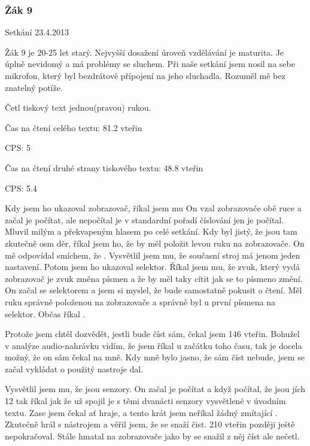 \subsubsection{Žák 9}
Setkání 23.4.2013

Žák 9 je 20-25 let starý.  Nejvyšší dosažení úroveň vzdělávání je maturita.  Je úplně nevidomý a má problémy se sluchem.  Při naše setkání jsem nosil na sebe mikrofon, který byl bezdrátově přípojení na jeho sluchadla.  Rozuměl mě bez znatelný potíže.

Četl tiskový text jednou(pravou) rukou.

Čas na čtení celého textu: 81.2 vteřin

CPS: 5

Čas na čtení druhé strany tiskového textu: 48.8 vteřin

CPS: 5.4

Kdy jsem ho ukazoval zobrazovač, říkal jsem mu  On vzal zobrazovače obě ruce a začal je počítat, ale nepočítal je v standardní pořadí číslování jen je počítal.  Mluvil milým a překvapeným hlasem po celé setkání. Kdy byl jistý, že jsou tam zkutečně osm děr, říkal jsem ho, že by měl položit levou ruku na zobrazovače.  On mě odpovídal smíchem, že . Vysvětlil jsem mu, že současní stroj má jenom jeden nastavení.  Potom jsem ho ukazoval selektor.  Říkal jsem mu, že zvuk, který vydá zobrazovač je zvuk změna písmen a že by měl taky cítit jak se to písmeno změní.  On začal  se selektorem a jsem si myslel, že bude samostatně pokusit o čtení.  Měl ruku správně položenou na zobrazovače a správně byl u první písmena na selektor.  Občas říkal .

Protože jsem chtěl dozvědět, jestli bude číst sám, čekal jsem 146 vteřin.  Bohužel v analýze audio-nahrávku vidím, že jsem říkal  u začátku toho času, tak je docela možný, že on sám čekal na mně.  Kdy mně bylo jasno, že sám číst nebude, jsem se začal vykládat o použitý nastroje dal.

Vysvětlil jsem mu, že  jsou senzory.  On začal je počítat a když počítal, že jsou jích 12 tak říkal  jak že už spojil je s těmi dvanácti senzory vysvětlené v úvodním textu. Zase jsem čekal ať hraje, a tento krát jsem neříkal žádný zmítající .  Zkutečně hrál s nástrojem a věřil jsem, že se snaží čist. 210 vteřin později ještě nepokračoval.  Stále hmatal na zobrazovače jako by se snažil z něj číst ale nečetl. %


